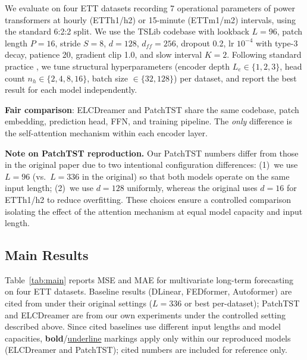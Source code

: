 \documentclass[conference]{IEEEtran}
\begin{document}
We evaluate on four ETT datasets \cite{b_informer} recording 7 operational parameters of power transformers at hourly (ETTh1/h2) or 15-minute (ETTm1/m2) intervals, using the standard 6:2:2 split. We use the TSLib codebase \cite{b_tslib} with lookback $L{=}96$, patch length $P{=}16$, stride $S{=}8$, $d{=}128$, $d_{ff}{=}256$, dropout 0.2, lr $10^{-4}$ with type-3 decay, patience 20, gradient clip 1.0, and slow interval $K{=}2$. Following standard practice \cite{b_patchtst}, we tune structural hyperparameters (encoder depth $L_e \in \{1,2,3\}$, head count $n_h \in \{2,4,8,16\}$, batch size $\in \{32,128\}$) per dataset, and report the best result for each model independently.

\textbf{Fair comparison}: ELCDreamer and PatchTST share the same codebase, patch embedding, prediction head, FFN, and training pipeline. The \emph{only} difference is the self-attention mechanism within each encoder layer.

\textbf{Note on PatchTST reproduction.} Our PatchTST numbers differ from those in the original paper \cite{b_patchtst} due to two intentional configuration differences: (1)~we use $L{=}96$ (vs.\ $L{=}336$ in the original) so that both models operate on the same input length; (2)~we use $d{=}128$ uniformly, whereas the original uses $d{=}16$ for ETTh1/h2 to reduce overfitting. These choices ensure a controlled comparison isolating the effect of the attention mechanism at equal model capacity and input length.

\subsection{Main Results}

Table~\ref{tab:main} reports MSE and MAE for multivariate long-term forecasting on four ETT datasets. Baseline results (DLinear, FEDformer, Autoformer) are cited from \cite{b_patchtst} under their original settings ($L{=}336$ or best per-dataset); PatchTST and ELCDreamer are from our own experiments under the controlled setting described above. Since cited baselines use different input lengths and model capacities, \textbf{bold}/\uline{underline} markings apply only within our reproduced models (ELCDreamer and PatchTST); cited numbers are included for reference only.
\end{document}
